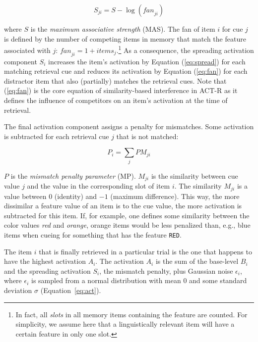 \documentclass{cambridge7A}\usepackage[]{graphicx}\usepackage[]{color}
\newcommand{\actrcue}[1]{\texttt{\uppercase{#1}}}
\begin{document}
\begin{equation}\label{eq:fan}
	S_{ji} = S - \log(\textit{fan}_{ji})
\end{equation}

\noindent
where $S$ is the  \textit{maximum associative strength} (MAS). The fan of item $i$ for cue $j$ is defined by the number of competing items in memory that match the feature associated with $j$: $\textit{fan}_{ji} = 1+\textit{items}_j$.\footnote{In fact, all \textit{slots} in all memory items containing the feature are counted. For simplicity, we assume here that a linguistically relevant item will have a certain feature in only one slot.}
As a consequence, the spreading activation component $S_i$ increases the item's activation by Equation (\ref{eq:spread}) for each matching retrieval cue and reduces its activation by Equation (\ref{eq:fan}) for each distractor item that also (partially) matches the retrieval cues. Note that (\ref{eq:fan}) is the core equation of  similarity-based interference in ACT-R as it defines the influence of competitors on an item's activation at the time of retrieval.

The final activation component assigns a penalty for mismatches. Some activation is subtracted for each retrieval cue $j$ that is not matched:

\begin{equation}\label{eq:pm}
	P_i = \sum_j PM_{ji}
\end{equation}

\noindent
$P$ is the  \textit{mismatch penalty parameter} (MP). $M_{ji}$ is the similarity between cue value $j$ and the value in the corresponding slot of item $i$. The similarity $M_{ji}$ is a value between $0$ (identity) and $-1$ (maximum difference).
This way, the more dissimilar a feature value of an item is to the cue value, the more activation is subtracted for this item.
If, for example, one defines some similarity between the color values \textit{red} and \textit{orange}, orange items would be less penalized than, e.g., blue items when cueing for something that has the feature \actrcue{red}.

The item $i$ that is finally retrieved in a particular trial is the one that happens to have the highest activation $A_i$.
The activation $A_i$ is the sum of the base-level $B_i$ and the spreading activation $S_i$, the mismatch penalty, plus Gaussian noise $\epsilon_i$, where $\epsilon_i$ is sampled from a normal distribution with mean 0 and some standard deviation $\sigma$ (Equation~\ref{eq:act}).
\end{document}
